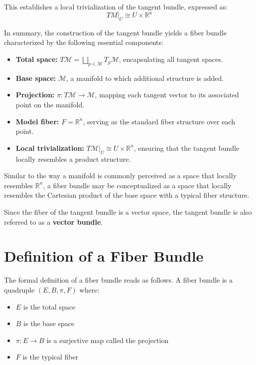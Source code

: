This establishes a local trivialization of the tangent bundle, expressed as:
\[
TM|_U \cong U \times \mathbb{R}^n
\]

In summary, the construction of the tangent bundle yields a fiber bundle characterized by the following essential components:
\begin{itemize}
  \item \textbf{Total space:} \( T\mathcal{M} = \bigsqcup_{p \in \mathcal{M}} T_p\mathcal{M} \), encapsulating all tangent spaces.
  \item \textbf{Base space:} \( \mathcal{M} \), a manifold to which additional structure is added.
  \item \textbf{Projection:} \( \pi: T\mathcal{M} \to \mathcal{M} \), mapping each tangent vector to its associated point on the manifold.
  \item \textbf{Model fiber:} \( F = \mathbb{R}^n \), serving as the standard fiber structure over each point.
  \item \textbf{Local trivialization:} \( T\mathcal{M}|_U \cong U \times \mathbb{R}^n \), ensuring that the tangent bundle locally resembles a product structure.
\end{itemize}

 Similar to the way a manifold is commonly perceived as a space that locally resembles \( \mathbb{R}^n \), a fiber bundle may be conceptualized as a space that locally resembles the Cartesian product of the base space with a typical fiber structure. 

Since the fiber of the tangent bundle is a vector space, the tangent bundle is also referred to as a \textbf{vector bundle}.

\section{Definition of a Fiber Bundle}

The formal definition of a fiber bundle reads as follows\cite{FredericSchullerTopologicalmanifoldsmanifoldbundlesLec06FredericSchuller2015}.
A fiber bundle is a quadruple $(E, B, \pi, F)$ where:
\begin{itemize}
  \item $E$ is the total space
  \item $B$ is the base space
  \item $\pi: E \to B$ is a surjective map called the projection
  \item $F$ is the typical fiber
\end{itemize}

